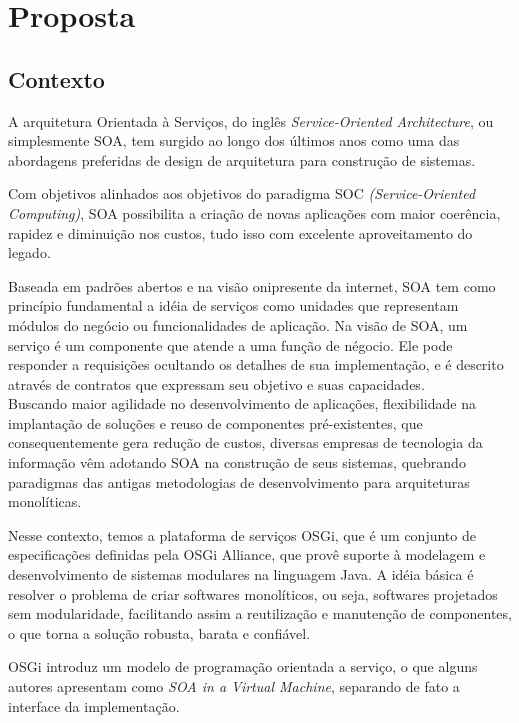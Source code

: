 \chapter{Proposta}
\section{Contexto}
\label{pr:contex}

A arquitetura Orientada à Serviços, do inglês \textit{Service-Oriented Architecture}, ou simplesmente SOA, tem surgido ao longo dos últimos anos como uma das abordagens preferidas de design de arquitetura para construção de sistemas. 

Com objetivos alinhados aos objetivos do paradigma SOC \textit{(Service-Oriented Computing)}, SOA possibilita a criação de novas aplicações com maior coerência, rapidez e diminuição nos custos, tudo isso com excelente aproveitamento do legado.

Baseada em padrões abertos e na visão onipresente da internet, SOA tem como princípio fundamental a idéia de serviços como unidades que representam módulos do negócio ou funcionalidades de aplicação.
Na visão de SOA, um serviço é um componente que atende a uma função de négocio. Ele pode responder a requisições ocultando os detalhes de sua implementação, e é descrito através de contratos que expressam seu objetivo e suas capacidades.
\\

Buscando maior agilidade no desenvolvimento de aplicações, flexibilidade na implantação de soluções e reuso de componentes pré-existentes, que consequentemente gera redução de custos, diversas empresas de tecnologia da informação vêm adotando SOA na construção de seus sistemas, quebrando paradigmas das antigas metodologias de desenvolvimento para arquiteturas monolíticas.

Nesse contexto, temos a plataforma de serviços OSGi, que é um conjunto de especificações definidas pela OSGi Alliance, que provê suporte à modelagem e desenvolvimento de sistemas modulares na linguagem Java. A idéia básica é resolver o problema de criar softwares monolíticos, ou seja, softwares projetados sem modularidade, facilitando assim a reutilização e manutenção de  componentes, o que torna a solução robusta, barata e confiável. 

OSGi introduz um modelo de programação orientada a serviço, o que alguns autores apresentam como \textit{SOA in a Virtual Machine}, separando de fato a interface da implementação.

